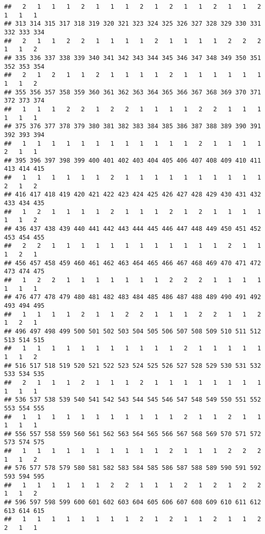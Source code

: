 \documentclass[]{article}
\begin{document}
\begin{verbatim}
##   2   1   1   1   2   1   1   1   2   1   2   1   1   2   1   1   2   1   1   1 
## 313 314 315 317 318 319 320 321 323 324 325 326 327 328 329 330 331 332 333 334 
##   2   1   1   2   2   1   1   1   1   2   1   1   1   1   2   2   2   1   1   2 
## 335 336 337 338 339 340 341 342 343 344 345 346 347 348 349 350 351 352 353 354 
##   2   1   2   1   1   2   1   1   1   1   2   1   1   1   1   1   1   1   1   2 
## 355 356 357 358 359 360 361 362 363 364 365 366 367 368 369 370 371 372 373 374 
##   1   1   1   2   2   1   2   2   1   1   1   1   2   2   1   1   1   1   1   1 
## 375 376 377 378 379 380 381 382 383 384 385 386 387 388 389 390 391 392 393 394 
##   1   1   1   1   1   1   1   1   1   1   1   1   2   1   1   1   1   2   1   1 
## 395 396 397 398 399 400 401 402 403 404 405 406 407 408 409 410 411 413 414 415 
##   1   1   1   1   1   1   2   1   1   1   1   1   1   1   1   1   1   2   1   2 
## 416 417 418 419 420 421 422 423 424 425 426 427 428 429 430 431 432 433 434 435 
##   1   2   1   1   1   1   2   1   1   1   2   1   2   1   1   1   1   1   1   2 
## 436 437 438 439 440 441 442 443 444 445 446 447 448 449 450 451 452 453 454 455 
##   2   2   1   1   1   1   1   1   1   1   1   1   1   1   2   1   1   1   2   1 
## 456 457 458 459 460 461 462 463 464 465 466 467 468 469 470 471 472 473 474 475 
##   1   2   2   1   1   1   1   1   1   1   2   2   2   1   1   1   1   1   1   1 
## 476 477 478 479 480 481 482 483 484 485 486 487 488 489 490 491 492 493 494 495 
##   1   1   1   1   2   1   1   2   2   1   1   1   2   2   1   1   2   1   2   1 
## 496 497 498 499 500 501 502 503 504 505 506 507 508 509 510 511 512 513 514 515 
##   1   1   1   1   1   1   1   1   1   1   1   2   1   1   1   1   1   1   1   2 
## 516 517 518 519 520 521 522 523 524 525 526 527 528 529 530 531 532 533 534 535 
##   2   1   1   1   2   1   1   1   2   1   1   1   1   1   1   1   1   1   1   1 
## 536 537 538 539 540 541 542 543 544 545 546 547 548 549 550 551 552 553 554 555 
##   1   1   1   1   1   1   1   1   1   1   1   2   1   1   2   1   1   1   1   1 
## 556 557 558 559 560 561 562 563 564 565 566 567 568 569 570 571 572 573 574 575 
##   1   1   1   1   1   1   1   1   1   1   2   1   1   1   2   2   2   1   1   2 
## 576 577 578 579 580 581 582 583 584 585 586 587 588 589 590 591 592 593 594 595 
##   1   1   1   1   1   1   2   2   1   1   1   2   1   2   1   2   2   1   1   2 
## 596 597 598 599 600 601 602 603 604 605 606 607 608 609 610 611 612 613 614 615 
##   1   1   1   1   1   1   1   1   2   1   2   1   1   2   1   1   2   2   1   1 

\end{verbatim}
\end{document}
